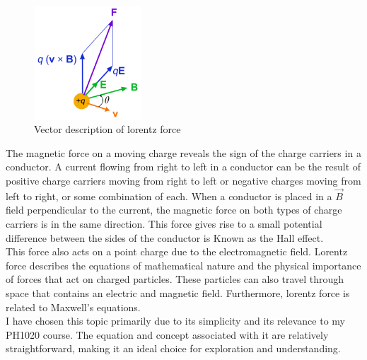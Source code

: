\documentclass{article}
\begin{document}
\begin{figure}[htp]
    \centering
    \includegraphics[width=4cm]{Lorentz_force_particle}
    \caption{Vector description of lorentz force}
    \label{fig:lorentz force vector}
\end{figure}
The magnetic force on a moving charge reveals the sign of the charge carriers in a
conductor. A current flowing from right to left in a conductor can be the result of
positive charge carriers moving from right to left or negative charges moving from left
to right, or some combination of each. When a conductor is placed in a \(\vec{B}\) field
perpendicular to the current, the magnetic force on both types of charge carriers is in
the same direction. This force gives rise to a small potential difference between the
sides of the conductor is Known as the Hall effect.\\
This force also acts on a point charge due to the electromagnetic field. Lorentz force
describes the equations of mathematical nature and the physical importance of forces
that act on charged particles. These particles can also travel through space that
contains an electric and magnetic field. Furthermore, \cite{ref=art} lorentz force is related to
Maxwell's equations.\\
I have chosen this topic primarily due to its simplicity and its relevance to my PH1020
course. The equation and concept associated with it are relatively straightforward,
making it an ideal choice for exploration and understanding.




\end{document}
